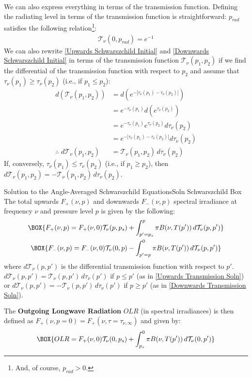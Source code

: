 We can also express everything in terms of the transmission function. Defining the radiating level in terms of the transmission function is straightforward: $p_{rad}$ satisfies the following relation\footnote{And, of course, $p_{rad}>0$.}:
\begin{align}
    \mathcal{T}_\nu(0,p_{rad})=e^{-1}
\end{align}
We can also rewrite \ref{Upwards Schwarszchild Initial} and \ref{Downwards Schwarszchild Initial} in terms of the transmission function $\mathcal{T}_\nu(p_1,p_2)$ if we find the differential of the transmission function with respect to $p_2$ and assume that $\tau_\nu(p_1)\geq\tau_\nu(p_2)$ (i.e., if $p_1\leq p_2$):
\begin{align*}
    d\left( \mathcal{T}_\nu(p_1,p_2) \right)&=d\left( e^{-|\tau_\nu(p_1)-\tau_\nu(p_2)|} \right)\\
    &=e^{-\tau_\nu(p_1)} d\left(e^{\tau_\nu(p_2)} \right)\\
    &= e^{-\tau_\nu(p_1)}e^{\tau_\nu(p_2)}d\tau_\nu(p_2) \\
    &=e^{-|\tau_\nu(p_1)-\tau_\nu(p_2)|}d\tau_\nu(p_2)\\
    \therefore\,\,d\mathcal{T}_\nu(p_1,p_2)&=\mathcal{T}_\nu(p_1,p_2)\,d\tau_\nu(p_2)
\end{align*}
If, conversely, $\tau_\nu(p_1)\leq\tau_\nu(p_2)$ (i.e., if $p_1\geq p_2$), then $d\mathcal{T}_\nu(p_1,p_2)=-\mathcal{T}_\nu(p_1,p_2)\,d\tau_\nu(p_2)$.

\begin{fact}{Solution to the Angle-Averaged Schwarszchild Equations}{Soln Schwarszchild Box}\label{Soln Schwarszchild Box}
    The total upwards $F_+(\nu,p)$ and downwards $F_-(\nu,p)$ spectral irradiance at frequency $\nu$ and pressure level $p$ is given by the following:
    \begin{gather}
        \label{Upwards Transmission Soln}
        \BOX{F_+(\nu,p)
        =
        F_+(\nu,0)\mathcal{T}_\nu(p,p_s)
        +
        \int_{p'=p_s}^{p}\pi B(\nu,T(p'))\,d\mathcal{T}_\nu(p,p')} 
        \\ 
        \label{Downwards Transmission Soln}
        \BOX{F_-(\nu,p)
        =
        F_-(\nu,0)\mathcal{T}_\nu(0,p)
        -
        \int_{p'=p}^{0}\pi B(\nu,T(p'))\,d\mathcal{T}_\nu(p,p') }
    \end{gather}
    where $d\mathcal{T}_\nu(p,p')$ is the differential transmission function with respect to $p'$. $d\mathcal{T}_\nu(p,p')=\mathcal{T}_\nu(p,p')\,d\tau_\nu(p')$ if $p\leq p'$ (as in \ref{Upwards Transmission Soln}) or $d\mathcal{T}_\nu(p,p')=-\mathcal{T}_\nu(p,p')\,d\tau_\nu(p')$ if $p\geq p'$ (as in \ref{Downwards Transmission Soln}).

    The \textbf{Outgoing Longwave Radiation} $OLR$ (in spectral irradiances) is then defined as $F_+(\nu,p=0)=F_+(\nu,\tau=\tau_{\nu,\infty})$ and given by:
    \begin{align}
        \BOX{OLR=
        F_+(\nu,0)\mathcal{T}_\nu(0,p_s)
        +
        \int_{p_s}^{0}\pi B(\nu,T(p'))\,d\mathcal{T}_\nu(0,p') }\label{OLR Transmission Soln}
    \end{align} 
\end{fact}

